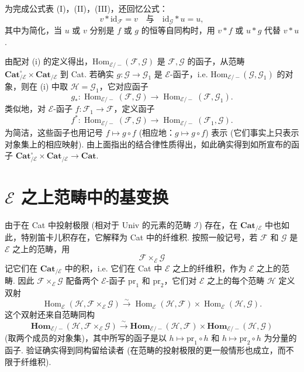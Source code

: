 为完成公式表 (I)，(II)，(III)，还回忆公式：
\begin{equation}
v * \mathrm{id}_{\mathcal{F}} = v \quad \text{与} \quad \mathrm{id}_{\mathcal{G}} * u = u, \tag{IV}
\label{eq:VI.IV}
\end{equation}
其中为简化，当 $u$ 或 $v$ 分别是 $f$ 或 $g$ 的恒等自同构时，用 $v * f$ 或 $u * g$ 代替 $v * u$.

由配对 (i) 的定义得出，Hom$_{\mathcal{E}/-}(\mathcal{F}, \mathcal{G})$ 是 $\mathcal{F}, \mathcal{G}$ 的函子，从范畴 $\mathbf{Cat}_{/\mathcal{E}}^{\circ} \times \mathbf{Cat}_{/\mathcal{E}}$ 到 Cat. 若确实 $g \colon \mathcal{G} \to \mathcal{G}_1$ 是 $\mathcal{E}$-函子，i.e. Hom$_{\mathcal{E}/-}(\mathcal{G}, \mathcal{G}_1)$ 的对象，则在 (i) 中取 $\mathcal{H} = \mathcal{G}_1$，它对应函子
\[
g_{*} \colon \operatorname{Hom}_{\mathcal{E}/-}(\mathcal{F}, \mathcal{G}) \longrightarrow \operatorname{Hom}_{\mathcal{E}/-}(\mathcal{F}, \mathcal{G}_1).
\]
类似地，对 $\mathcal{E}$-函子 $f \colon \mathcal{F}_1 \to \mathcal{F}$，定义函子
\[
f^{*} \colon \operatorname{Hom}_{\mathcal{E}/-}(\mathcal{F}, \mathcal{G}) \longrightarrow \operatorname{Hom}_{\mathcal{E}/-}(\mathcal{F}_1, \mathcal{G}).
\]
为简洁，这些函子也用记号 $f \mapsto g \circ f$ (相应地：$g \mapsto g \circ f$) 表示 (它们事实上只表示对象集上的相应映射). 由上面指出的结合律性质得出，如此确实得到如所宣布的函子 $\mathbf{Cat}_{/\mathcal{E}}^{\circ} \times \mathbf{Cat}_{/\mathcal{E}} \to \mathbf{Cat}$.

\section{\texorpdfstring{$\mathcal{E}$}{E} 之上范畴中的基变换}

由于在 Cat 中投射极限 (相对于 Univ 的元素的范畴 $\mathcal{I}$) 存在，在 $\mathbf{Cat}_{/\mathcal{E}}$ 中也如此，特别笛卡儿积存在，它解释为 Cat 中的纤维积. 按照一般记号，若 $\mathcal{F}$ 和 $\mathcal{G}$ 是 $\mathcal{E}$ 之上的范畴，用
\[
\mathcal{F} \times_{\mathcal{E}} \mathcal{G}
\]
记它们在 $\mathbf{Cat}_{/\mathcal{E}}$ 中的积，i.e. 它们在 Cat 中 $\mathcal{E}$ 之上的纤维积，作为 $\mathcal{E}$ 之上的范畴. 因此 $\mathcal{F} \times_{\mathcal{E}} \mathcal{G}$ 配备两个 $\mathcal{E}$-函子 $\mathrm{pr}_1$ 和 $\mathrm{pr}_2$，它们对 $\mathcal{E}$ 之上的每个范畴 $\mathcal{H}$ 定义双射
\[
\operatorname{Hom}_{\mathcal{E}}(\mathcal{H}, \mathcal{F} \times_{\mathcal{E}} \mathcal{G}) \stackrel{\sim}{\longrightarrow} \operatorname{Hom}_{\mathcal{E}}(\mathcal{H}, \mathcal{F}) \times \operatorname{Hom}_{\mathcal{E}}(\mathcal{H}, \mathcal{G}).
\]
这个双射还来自范畴同构
\[
\mathbf{Hom}_{\mathcal{E}/-}(\mathcal{H}, \mathcal{F} \times_{\mathcal{E}} \mathcal{G}) \stackrel{\sim}{\longrightarrow} \mathbf{Hom}_{\mathcal{E}/-}(\mathcal{H}, \mathcal{F}) \times \mathbf{Hom}_{\mathcal{E}/-}(\mathcal{H}, \mathcal{G})
\]
(取两个成员的对象集)，其中所写的函子是以 $h \mapsto \mathrm{pr}_1 \circ h$ 和 $h \mapsto \mathrm{pr}_2 \circ h$ 为分量的函子. 验证确实得到同构留给读者 (在范畴的投射极限的更一般情形也成立，而不限于纤维积).

